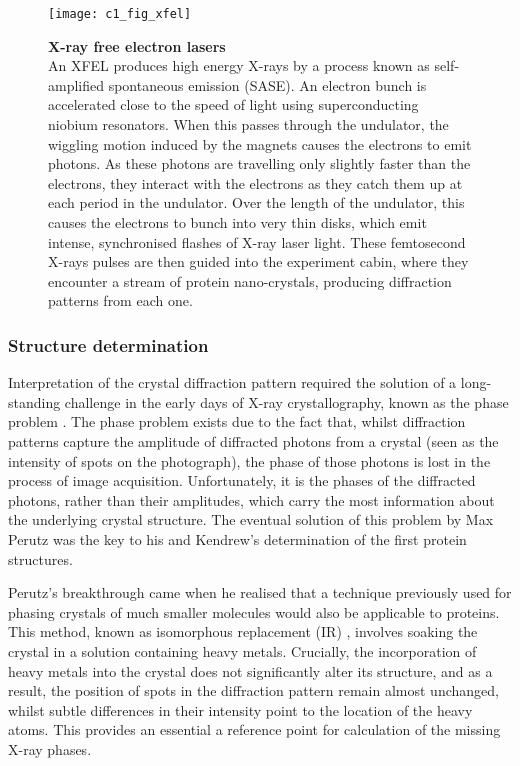 \documentclass[a4paper,11pt,twoside,openright]{scrbook}
\begin{document}
\begin{figure}[h]
    \texttt{[image: c1\_fig\_xfel]}
    \caption[X-ray free electron lasers]{\sffamily \textbf{X-ray free electron lasers} \\ \small An XFEL produces high energy X-rays by a process known as self-amplified spontaneous emission (SASE). An electron bunch is accelerated close to the speed of light using superconducting niobium resonators. When this passes through the undulator, the wiggling motion induced by the magnets causes the electrons to emit photons. As these photons are travelling only slightly faster than the electrons, they interact with the electrons as they catch them up at each period in the undulator. Over the length of the undulator, this causes the electrons to bunch into very thin disks, which emit intense, synchronised flashes of X-ray laser light. These femtosecond X-rays pulses are then guided into the experiment cabin, where they encounter a stream of protein nano-crystals, producing diffraction patterns from each one.}
    \label{figure:xfels}
\end{figure}

\subsubsection{Structure determination}
Interpretation of the crystal diffraction pattern required the solution of a long-standing challenge in the early days of X-ray crystallography, known as the phase problem \cite{Taylor2003}. The phase problem exists due to the fact that, whilst diffraction patterns capture the amplitude of diffracted photons from a crystal (seen as the intensity of spots on the photograph), the phase of those photons is lost in the process of image acquisition. Unfortunately, it is the phases of the diffracted photons, rather than their amplitudes, which carry the most information about the underlying crystal structure. The eventual solution of this problem by Max Perutz was the key to his and Kendrew's determination of the first protein structures.

Perutz's breakthrough came when he realised that a technique previously used for phasing crystals of much smaller molecules would also be applicable to proteins. This method, known as isomorphous replacement (IR)  \cite{Robertson1936}, involves soaking the crystal in a solution containing heavy metals. Crucially, the incorporation of heavy metals into the crystal does not significantly alter its structure, and as a result, the position of spots in the diffraction pattern remain almost unchanged, whilst subtle differences in their intensity point to the location of the heavy atoms. This provides an essential a reference point for calculation of the missing X-ray phases.
\end{document}

